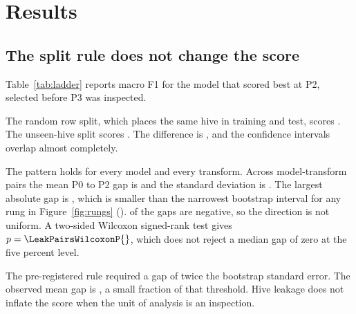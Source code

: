﻿\documentclass[review,12pt]{elsarticle}
\begin{document}
\section{Results}

\subsection{The split rule does not change the score}

Table~\ref{tab:ladder} reports macro F1 for the model that scored best at P2,
selected before P3 was inspected.

The random row split, which places the same hive in training and test, scores
\LeakBandsPzeroHistGradientBoostingMacroFone{}.
The unseen-hive split scores \LeakBandsPtwoHistGradientBoostingMacroFone{}.
The difference is \LeakBandsTotalGapHistGradientBoosting{}, and the confidence
intervals overlap almost completely.

The pattern holds for every model and every transform.
Across \LeakPairsN{} model-transform pairs the mean P0 to P2 gap is
\LeakPairsMeanGap{} and the standard deviation is \LeakPairsSdGap{}.
The largest absolute gap is \LeakPairsAbsMax{}, which is smaller than the
narrowest bootstrap interval for any rung in Figure~\ref{fig:rungs}
(\LeakPairsMinCiWidth{}).
\LeakPairsNegative{} of the \LeakPairsN{} gaps are negative, so the direction is
not uniform.
A two-sided Wilcoxon signed-rank test gives $p = \LeakPairsWilcoxonP{}$, which
does not reject a median gap of zero at the five percent level.

The pre-registered rule required a gap of twice the bootstrap standard error.
The observed mean gap is \LeakPairsMeanGap{}, a small fraction of that
threshold.
Hive leakage does not inflate the score when the unit of analysis is an
inspection.
\end{document}
